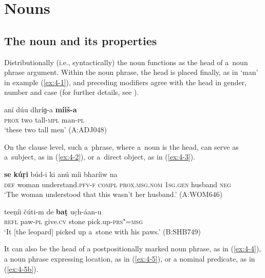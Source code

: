 \chapter{Nouns}
\label{chap:4}

\section{The noun and its properties}
\label{sec:4-1}


Distributionally (i.e., syntactically) the noun functions as the head of a~noun phrase argument. Within the noun phrase, the head is placed finally, as in `man' in example (\ref{ex:4-1}), and preceding modifiers agree with the head in gender, number and case (for further details, see ).


\begin{exe}
\ex
\label{ex:4-1}
\gll aní dúu dhríɡ-a \textbf{míiš-a} \\
	\textsc{prox} two tall-\textsc{mpl} man-\textsc{pl} \\
\glt `these two tall men' (A:ADJ048)
\end{exe}

On the clause level, such a~phrase, where a~noun is the head, can serve as a~subject, as in (\ref{ex:4-2}), or a~direct object, as in (\ref{ex:4-3}).

\begin{exe}
\ex
\label{ex:4-2}
\gll \textbf{se} \textbf{kúṛi} búd-i ki anú míi bharíiw na\\
	\textsc{def} woman understand.\textsc{pfv-f} \textsc{compl} \textsc{prox.msg.nom} \textsc{1sg.gen} husband \textsc{neg}\\
\glt `The woman understood that this wasn't her husband.' (A:WOM646)

\ex
\label{ex:4-3}
\gll teeṇíi čúti-m de \textbf{baṭ} uc̣h-áan-u \\
	\textsc{refl} paw-\textsc{pl} give.\textsc{cv} stone pick.up-\textsc{prs"=msg} \\
\glt `It [the leopard] picked up a~stone with his paws.' (B:SHB749)
\end{exe}

It can also be the head of a postpositionally marked noun phrase, as in (\ref{ex:4-4}), a noun phrase expressing location, as in (\ref{ex:4-5}), or a nominal predicate, as in (\ref{ex:4-5b}).

